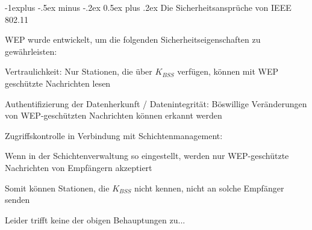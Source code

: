 \documentclass[a4paper]{article}
\makeatletter
\renewcommand{\subsection}{\@startsection{subsection}{2}{0mm}%
 {-1explus -.5ex minus -.2ex}%
 {0.5ex plus .2ex}%
 {\normalfont\normalsize\bfseries}}
\makeatother
\begin{document}
\begin{multicols}{3}
      \subsection{Die Sicherheitsansprüche von IEEE 802.11}
      \begin{itemize*}
            \item WEP wurde entwickelt, um die folgenden Sicherheitseigenschaften zu gewährleisten:
            \begin{itemize*}
                  \item Vertraulichkeit: Nur Stationen, die über $K_{BSS}$ verfügen, können mit WEP geschützte Nachrichten lesen
                  \item Authentifizierung der Datenherkunft / Datenintegrität: Böswillige Veränderungen von WEP-geschützten Nachrichten können erkannt werden
                  \item Zugriffskontrolle in Verbindung mit Schichtenmanagement:
                  \begin{itemize*}
                        \item Wenn in der Schichtenverwaltung so eingestellt, werden nur WEP-geschützte Nachrichten von Empfängern akzeptiert
                        \item Somit können Stationen, die $K_{BSS}$ nicht kennen, nicht an solche Empfänger senden
                  \end{itemize*}
            \end{itemize*}
            \item Leider trifft keine der obigen Behauptungen zu...
      \end{itemize*}


\end{multicols}
\end{document}
